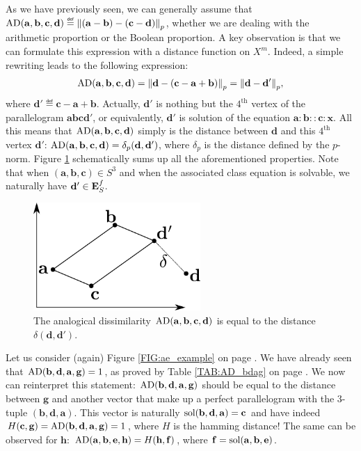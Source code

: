As we have previously seen, we can generally assume that
$\AD(\mathbf{a},\mathbf{b},\mathbf{c},\mathbf{d}) \eqdef
\norm{p}{(\mathbf{a}-\mathbf{b})-(\mathbf{c}-\mathbf{d})}$, whether we are
dealing with the arithmetic proportion or the Boolean proportion.
A key observation is that we can formulate this expression with a distance
function on $X^m$. Indeed, a simple rewriting leads to the following expression:
$$\AD(\mathbf{a},\mathbf{b},\mathbf{c},\mathbf{d})=\norm{p}{\mathbf{d} -
(\mathbf{c}-\mathbf{a}+\mathbf{b})}=\norm{p}{\mathbf{d} - \mathbf{d}'},$$
where $\mathbf{d}'\eqdef\mathbf{c}-\mathbf{a}+\mathbf{b}$. Actually,
$\mathbf{d}'$ is nothing but the $4^\text{th}$ vertex of the parallelogram
$\mathbf{a}\mathbf{b}\mathbf{c}\mathbf{d}'$, or equivalently, $\mathbf{d}'$ is
solution of the equation $\mathbf{a}: \mathbf{b} :: \mathbf{c} : \mathbf{x}$.
All this means that $\AD(\mathbf{a},\mathbf{b},\mathbf{c},\mathbf{d})$ simply
is the distance between $\mathbf{d}$ and this $4^\text{th}$ vertex
$\mathbf{d}'$: $\AD(\mathbf{a},\mathbf{b},\mathbf{c},\mathbf{d}) =
\delta_p(\mathbf{d}, \mathbf{d}')$, where $\delta_p$ is the distance defined by
the $p$-norm. Figure \ref{FIG:analogical_dissimilarity} schematically sums up all the aforementioned
properties.  Note that when $(\mathbf{a}, \mathbf{b}, \mathbf{c}) \in S^3$ and
when the associated class equation is solvable, we naturally have $\mathbf{d}'
\in \esf$.
\begin{figure}[!h]
\centering
  \includegraphics[width=2.5in]{figures/analogical_dissimilarity.pdf}
  \caption{The analogical dissimilarity
  $\AD(\mathbf{a},\mathbf{b},\mathbf{c},\mathbf{d})$ is equal to the distance
  $\delta(\mathbf{d}, \mathbf{d}')$.}
\label{FIG:analogical_dissimilarity}
\end{figure}

\begin{testexample}
Let us consider (again) Figure \ref{FIG:ae_example} on page
\pageref{FIG:ae_example2}. We have already seen that $\AD(\mathbf{b},
\mathbf{d}, \mathbf{a}, \mathbf{g}) = 1$, as proved by Table \ref{TAB:AD_bdag}
  on page \pageref{TAB:AD_bdag}.
We now can reinterpret this statement: $\AD(\mathbf{b}, \mathbf{d}, \mathbf{a},
\mathbf{g})$ should be equal to the distance between $\mathbf{g}$ and another
vector that make up a perfect parallelogram with the $3$-tuple
$(\mathbf{b},\mathbf{d}, \mathbf{a})$. This vector is naturally
$\sol(\mathbf{b},\mathbf{d}, \mathbf{a}) = \mathbf{c}$ and have indeed
$H(\mathbf{c}, \mathbf{g}) =  \AD(\mathbf{b}, \mathbf{d}, \mathbf{a},
\mathbf{g}) = 1$, where $H$ is the hamming distance! The same can be observed
for $\mathbf{h}$: $\AD(\mathbf{a}, \mathbf{b}, \mathbf{e}, \mathbf{h}) =
H(\mathbf{h}, \mathbf{f})$, where $\mathbf{f} = \sol(\mathbf{a}, \mathbf{b},
\mathbf{e})$.
\end{testexample}

